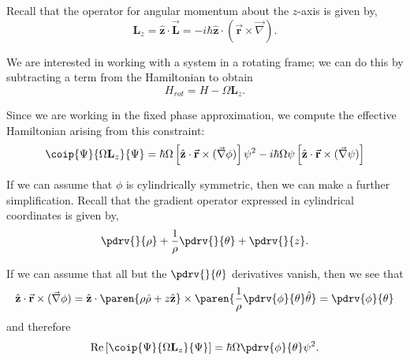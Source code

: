 \documentclass[onecolumn,,amsmath,amssymb,nofootinbib,floatfix]{revtex4}
\begin{document}
Recall that the operator for angular momentum about the $z$-axis is given by,
$$\textbf{L}_z = \hat{\textbf{z}}\cdot \vec{\textbf{L}} = -i\hbar\hat{\textbf{z}}\cdot (\vec{\textbf{r}}\times\vec{\nabla}).$$

We are interested in working with a system in a rotating frame;  we can do this by subtracting a term from the Hamiltonian to obtain
$$H_{rot} = H - \Omega \textbf{L}_z.$$

Since we are working in the fixed phase approximation, we compute the effective Hamiltonian arising from this constraint:
$$\coip{\Psi}{\Omega\textbf{L}_z}{\Psi} = \hbar\Omega\left[\hat{\textbf{z}}\cdot\vec{\textbf{r}}\times(\vec{\nabla}\phi)\right]\psi^2-i\hbar\Omega\psi\left[\hat{\textbf{z}}\cdot\vec{\textbf{r}}\times(\vec{\nabla}\psi)\right]$$

If we can assume that $\phi$ is cylindrically symmetric, then we can make a further simplification.  Recall that the gradient operator expressed in cylindrical coordinates is given by,
$$\pdrv{}{\rho} + \frac{1}{\rho}\pdrv{}{\theta} + \pdrv{}{z}.$$

If we can assume that all but the $\pdrv{}{\theta}$ derivatives vanish, then we see that
$$
\begin{aligned}
\hat{\textbf{z}}\cdot\vec{\textbf{r}}\times(\vec{\nabla}\phi)
= \hat{\textbf{z}}\cdot\paren{\rho \hat{\rho} + z\hat{\textbf{z}}}\times\paren{\frac{1}{\rho}\pdrv{\phi}{\theta}\hat\theta}
= \pdrv{\phi}{\theta}\\ 
\end{aligned}
$$
and therefore
$$\text{Re}\left[\coip{\Psi}{\Omega \textbf{L}_z}{\Psi}\right] = \hbar \Omega\pdrv{\phi}{\theta}\psi^2.$$
\end{document}
